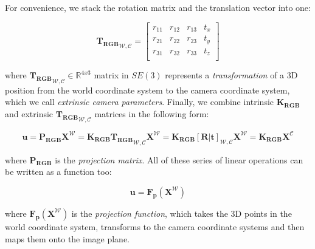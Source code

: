 \documentclass[a4paper]{report}
\numberwithin{figure}{section}
\newcommand{\R}{\mathbb{R}}
\begin{document}
For convenience, we stack the rotation matrix and the translation vector into 
one:

\begin{equation}
  {\mathbf{T_{RGB}}}_{\mathcal{W}, \mathcal{C}} =
  \begin{bmatrix}
    r_{11} & r_{12} & r_{13} & t_x\\
    r_{21} & r_{22} & r_{23} & t_y\\
    r_{31} & r_{32} & r_{33} & t_z\\
  \end{bmatrix}\label{eq:transformation_matrix}
\end{equation} 

where ${\mathbf{T_{RGB}}}_{\mathcal{W}, \mathcal{C}} \in \R^{4x3}$ matrix 
in $SE(3)$ represents a 
\textit{transformation} of a 3D position from the world coordinate system to 
the 
camera coordinate system, which we call \textit{extrinsic camera parameters}.  
Finally, we combine intrinsic $\mathbf{K_{RGB}}$ and extrinsic 
${\mathbf{T_{RGB}}}_{\mathcal{W}, \mathcal{C}}$ matrices in the following form:

\begin{equation}\label{eq:simplyfied_proj_func_1}
  \mathbf{u} = 
  \mathbf{P_{RGB}}\mathbf{X^{\mathcal{W}}} = 
  \mathbf{K_{RGB}}{\mathbf{T_{RGB}}}_{\mathcal{W}, 
  \mathcal{C}}\mathbf{X^{\mathcal{W}}} 
  = 
  \mathbf{K_{RGB}}[\mathbf{R}|\mathbf{t}]_{\mathcal{W}, 
  \mathcal{C}} \mathbf{X^{\mathcal{W}}} =
  \mathbf{K_{RGB}}\mathbf{X^{\mathcal{C}}}
\end{equation} 

where $\mathbf{P_{RGB}}$ is the \textit{projection matrix}. All of these 
series of linear operations can be written as a function too:

\begin{equation}\label{eq:simplyfied_proj_func_2}
  \mathbf{u} = \mathbf{F_{p}}(\mathbf{X^{\mathcal{W}}})
\end{equation} 

where $\mathbf{F_{p}}(\mathbf{X^{\mathcal{W}}})$ is the \textit{projection 
function}, 
which takes the 3D points in the world coordinate system, transforms to the 
camera coordinate systems and then maps them onto the image plane.
\end{document}
